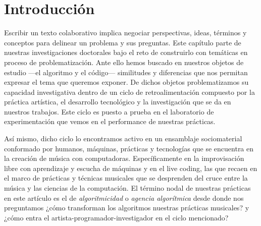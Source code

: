 

\section{Introducción}
Escribir un texto colaborativo implica negociar perspectivas, ideas, términos y conceptos para delinear un problema y sus preguntas. Este capítulo parte de nuestras investigaciones doctorales bajo el reto de construirlo con temáticas en proceso de problematización. Ante ello hemos buscado en nuestros objetos de estudio ---el algoritmo y el código--- similitudes y diferencias que nos permitan expresar el tema que queremos exponer. De dichos objetos problematizamos su capacidad investigativa dentro de un ciclo de retroalimentación compuesto por la práctica artística, el desarrollo tecnológico y la investigación que se da en nuestros trabajos. Este ciclo es puesto a prueba en el laboratorio de experimentación que vemos en el performance de nuestras prácticas.

Así mismo, dicho ciclo lo encontramos activo en un ensamblaje sociomaterial conformado por humanos, máquinas, prácticas y tecnologías que se encuentra en la creación de música con computadoras. Específicamente en la improvisación libre con aprendizaje y escucha de máquinas y en el live coding, las que recaen en el marco de prácticas y técnicas musicales que se desprenden del cruce entre la música y las ciencias de la computación. El término nodal de nuestras prácticas en este artículo es el de \emph{ algoritmicidad} o \emph{agencia algorítmica} desde donde nos preguntamos ¿cómo transforman los algoritmos nuestras prácticas musicales? y ¿cómo entra el artista-programador-investigador en el ciclo mencionado?

